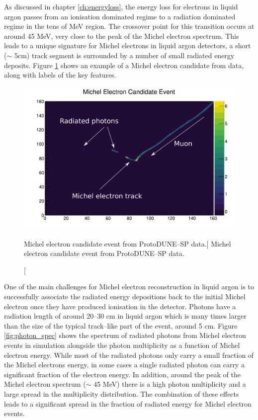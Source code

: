 As discussed in chapter \ref{ch:energyloss}, the energy loss for electrons in
liquid argon passes from an ionisation dominated regime to a radiation dominated
regime in the tens of MeV region. The crossover point for this transition occurs
at around 45 MeV, very close to the peak of the Michel electron spectrum. This
leads to a unique signature for Michel electrons in liquid argon detectors, a
short ($\sim$ 5cm) track segment is surrounded by a number of small radiated 
energy deposits. Figure \ref{fig:michel_event} shows an example of a Michel 
electron candidate from \protodune{} data, along with labels of the key 
features.

\begin{figure}
	\centering
	\includegraphics[width=\textwidth]{figures/michel_candidate_labelled.pdf}
	\caption
	[Michel electron candidate event from ProtoDUNE--SP data.]
	{Michel electron candidate event from ProtoDUNE--SP data.}
	\label{fig:michel_event}
\end{figure}

One of the main challenges for Michel electron reconstruction in liquid argon is
to successfully associate the radiated energy depositions back to the initial
Michel electron once they have produced ionisation in the detector. Photons have
a radiation length of around 20--30 cm in liquid argon which is many times
larger than the size of the typical track--like part of the event, around 5 cm. 
Figure \ref{fig:photon_spec} shows the spectrum of radiated photons from Michel 
electron events in \protodune{} simulation alongside the photon multiplicity 
as a function of Michel electron energy. While most of the radiated photons 
only carry a small fraction of the Michel electrons energy, in some cases a 
single radiated photon can carry a significant fraction of the electron 
energy. In addition, around the peak of the Michel electron spectrum ($\sim$
45 MeV) there is a high photon multiplicity and a large spread in the
multiplicity distribution. The combination of these effects leads to a
significant spread in the fraction of radiated energy for Michel electron
events.

